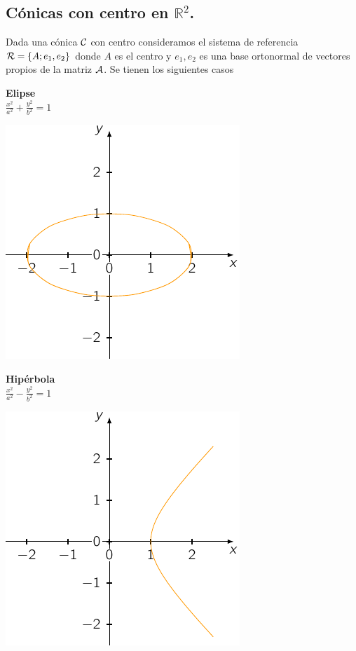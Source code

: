 \documentclass[11pt, a4paper]{article}
\newif\IfInSansMode
\theoremstyle{theorem-style}
\theoremstyle{definition-style}
\theoremstyle{remark-style}
\theoremstyle{example-style}
\begin{document}
\subsection{\bf  C\'onicas con centro en $\mathbb{R}^2$.}

\vspace{.5cm}

Dada una c\'onica $\cal C$ con centro consideramos el sistema de referencia 
${\cal R}=\{A; e_1,e_2\}$ donde $A$ 
es el centro y $e_1,e_2$ es una base ortonormal de vectores propios de la matriz $\cal A$. Se tienen los siguientes casos

\begin{minipage}[c]{0.45\textwidth}
  {\bf Elipse}\vspace{1em}\\
  $\displaystyle \frac{{x}^2}{a^2} + \frac{{y}^2}{b^2} = 1$
\end{minipage}\hfill
\begin{minipage}[]{0.35\textwidth}
\includegraphics{./img/elip.pdf} 
\end{minipage}

\begin{minipage}[c]{0.45\textwidth}
  {\bf Hipérbola}\vspace{1em}\\
  $\displaystyle \frac{{x}^2}{a^2} - \frac{{y}^2}{b^2} = 1$
\end{minipage}\hfill
\begin{minipage}[]{0.35\textwidth}
\includegraphics{./img/hipe.pdf}
\end{minipage}
\end{document}

